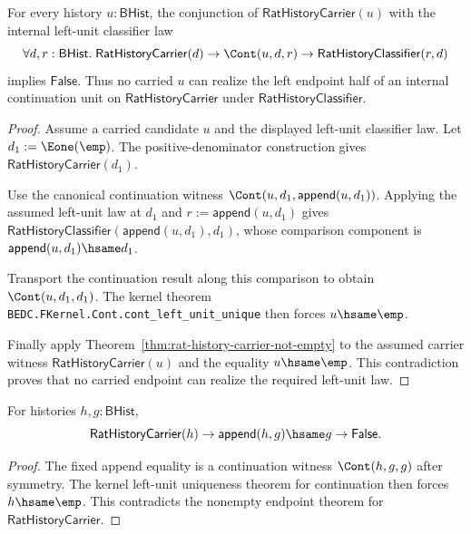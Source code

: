 \begin{theorem}
\label{thm:field-rat-denominator-continuation-no-internal-left-unit}
For every history $u:\mathsf{BHist}$, the conjunction of
$\mathsf{RatHistoryCarrier}(u)$ with the internal left-unit classifier law
$$
\forall d,r:\mathsf{BHist}.\;
\mathsf{RatHistoryCarrier}(d)\to
\Cont(u,d,r)\to
\mathsf{RatHistoryClassifier}(r,d)
$$
implies $\mathsf{False}$. Thus no carried $u$ can realize the left endpoint
half of an internal continuation unit on $\mathsf{RatHistoryCarrier}$ under
$\mathsf{RatHistoryClassifier}$.
\end{theorem}
\begin{proof}
Assume a carried candidate $u$ and the displayed left-unit classifier law. Let
$d_1:=\Eone(\emp)$. The positive-denominator construction gives
$\mathsf{RatHistoryCarrier}(d_1)$.

Use the canonical continuation witness
$\Cont(u,d_1,\mathsf{append}(u,d_1))$. Applying the assumed left-unit law at
$d_1$ and $r:=\mathsf{append}(u,d_1)$ gives
$\mathsf{RatHistoryClassifier}(\mathsf{append}(u,d_1),d_1)$, whose comparison
component is $\mathsf{append}(u,d_1)\hsame d_1$.

Transport the continuation result along this comparison to obtain
$\Cont(u,d_1,d_1)$. The kernel theorem
\texttt{BEDC.FKernel.Cont.cont\_left\_unit\_unique} then forces
$u\hsame\emp$.

Finally apply Theorem~\ref{thm:rat-history-carrier-not-empty} to the assumed
carrier witness $\mathsf{RatHistoryCarrier}(u)$ and the equality
$u\hsame\emp$. This contradiction proves that no carried endpoint can realize
the required left-unit law.
\end{proof}

\begin{theorem}
\label{thm:rat-history-carrier-right-append-fixed-absurd}
For histories $h,g:\mathsf{BHist}$,
$$
\mathsf{RatHistoryCarrier}(h)\to
\mathsf{append}(h,g)\hsame g\to
\mathsf{False}.
$$
\end{theorem}
\begin{proof}
The fixed append equality is a continuation witness $\Cont(h,g,g)$ after
symmetry. The kernel left-unit uniqueness theorem for continuation then forces
$h\hsame\emp$. This contradicts the nonempty endpoint theorem for
$\mathsf{RatHistoryCarrier}$.
\end{proof}

